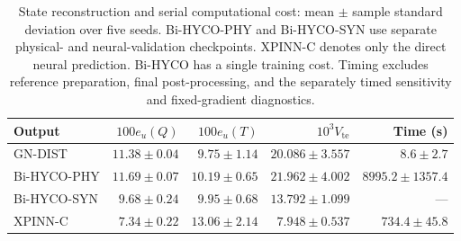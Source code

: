 \begin{table}[t]
\centering
\small
\setlength{\tabcolsep}{5pt}
\begin{tabular}{lrrrr}
\toprule
Output & $100e_u(Q)$ & $100e_u(T)$ & $10^3V_{\mathrm{te}}$ & Time (s) \\
\midrule
GN-DIST & $11.38 \pm 0.04$ & $9.75 \pm 1.14$ & $20.086 \pm 3.557$ & $8.6 \pm 2.7$ \\
Bi-HYCO-PHY & $11.69 \pm 0.07$ & $10.19 \pm 0.65$ & $21.962 \pm 4.002$ & $8995.2 \pm 1357.4$ \\
Bi-HYCO-SYN & $9.68 \pm 0.24$ & $9.95 \pm 0.68$ & $13.792 \pm 1.099$ & --- \\
XPINN-C & $7.34 \pm 0.22$ & $13.06 \pm 2.14$ & $7.948 \pm 0.537$ & $734.4 \pm 45.8$ \\
\bottomrule
\end{tabular}
\caption{State reconstruction and serial computational cost: mean $\pm$ sample standard deviation over five seeds. Bi-HYCO-PHY and Bi-HYCO-SYN use separate physical- and neural-validation checkpoints. XPINN-C denotes only the direct neural prediction. Bi-HYCO has a single training cost. Timing excludes reference preparation, final post-processing, and the separately timed sensitivity and fixed-gradient diagnostics.}
\label{tab:ac-five-seed-states}
\end{table}

